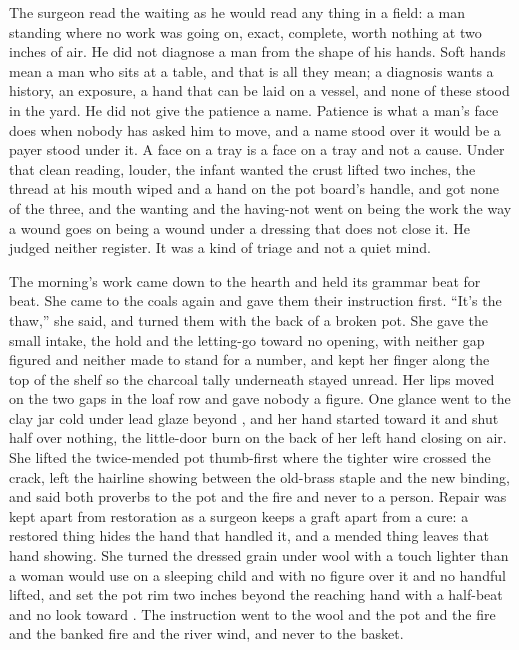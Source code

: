 The surgeon read the waiting as he would read any thing in a field: a man standing where no work was going on, exact, complete, worth nothing at two inches of air. He did not diagnose a man from the shape of his hands. Soft hands mean a man who sits at a table, and that is all they mean; a diagnosis wants a history, an exposure, a hand that can be laid on a vessel, and none of these stood in the yard. He did not give the patience a name. Patience is what a man's face does when nobody has asked him to move, and a name stood over it would be a payer stood under it. A face on a tray is a face on a tray and not a cause. Under that clean reading, louder, the infant wanted the crust lifted two inches, the thread at his mouth wiped and a hand on the pot board's handle, and got none of the three, and the wanting and the having-not went on being the work the way a wound goes on being a wound under a dressing that does not close it. He judged neither register. It was a kind of triage and not a quiet mind.

\scenebreak

The morning's work came down to the hearth and held its grammar beat for beat. She came to the coals again and gave them their instruction first. “It's the thaw,” she said, and turned them with the back of a broken pot. She gave the small intake, the hold and the letting-go toward no opening, with neither gap figured and neither made to stand for a number, and kept her finger along the top of the shelf so the charcoal tally underneath stayed unread. Her lips moved on the two gaps in the loaf row and gave nobody a figure. One glance went to the clay jar cold under lead glaze beyond , and her hand started toward it and shut half over nothing, the little-door burn on the back of her left hand closing on air. She lifted the twice-mended pot thumb-first where the tighter wire crossed the crack, left the hairline showing between the old-brass staple and the new binding, and said both proverbs to the pot and the fire and never to a person. Repair was kept apart from restoration as a surgeon keeps a graft apart from a cure: a restored thing hides the hand that handled it, and a mended thing leaves that hand showing. She turned the dressed grain under wool with a touch lighter than a woman would use on a sleeping child and with no figure over it and no handful lifted, and set the pot rim two inches beyond the reaching hand with a half-beat and no look toward . The instruction went to the wool and the pot and the fire and the banked fire and the river wind, and never to the basket.

